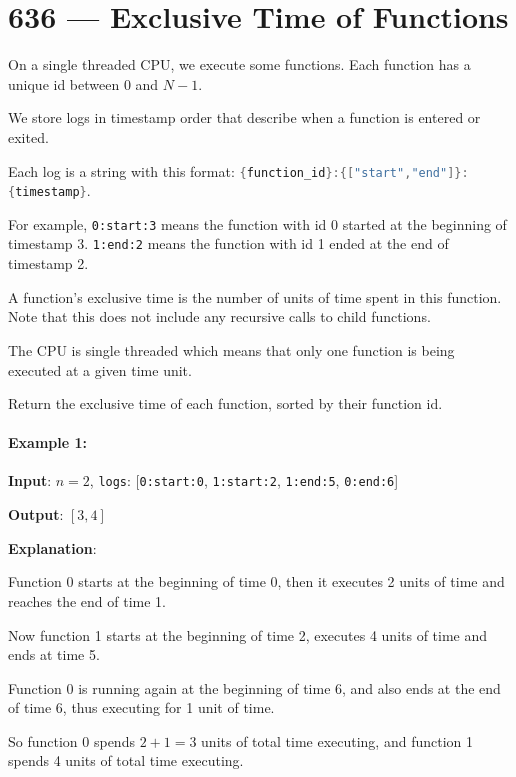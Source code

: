 \section{636 --- Exclusive Time of Functions}
On a single threaded CPU, we execute some functions.  Each function has a unique id between 0 and $N-1$.

We store logs in timestamp order that describe when a function is entered or exited.

Each log is a string with this format: \lstinline[language=Java, basicstyle=\small\ttfamily, keywordstyle=\bfseries\color{green!40!black}]|{function_id}:{["start","end"]}:{timestamp}|.  

For example, \texttt{0:start:3} means the function with id 0 started at the beginning of timestamp 3.  \texttt{1:end:2} means the function with id 1 ended at the end of timestamp 2.

A function's exclusive time is the number of units of time spent in this function.  Note that this does not include any recursive calls to child functions.

The CPU is single threaded which means that only one function is being executed at a given time unit.

Return the exclusive time of each function, sorted by their function id.
 

\paragraph{Example 1:}

\begin{flushleft}
\textbf{Input}: $n = 2$, \texttt{logs}: [\texttt{0:start:0}, \texttt{1:start:2}, \texttt{1:end:5}, \texttt{0:end:6}]

\textbf{Output}: $[3, 4]$

\textbf{Explanation}:

Function 0 starts at the beginning of time 0, then it executes 2 units of time and reaches the end of time 1.

Now function 1 starts at the beginning of time 2, executes 4 units of time and ends at time 5.

Function 0 is running again at the beginning of time 6, and also ends at the end of time 6, thus executing for 1 unit of time. 

So function 0 spends $2 + 1 = 3$ units of total time executing, and function 1 spends 4 units of total time executing.


\end{flushleft} 

